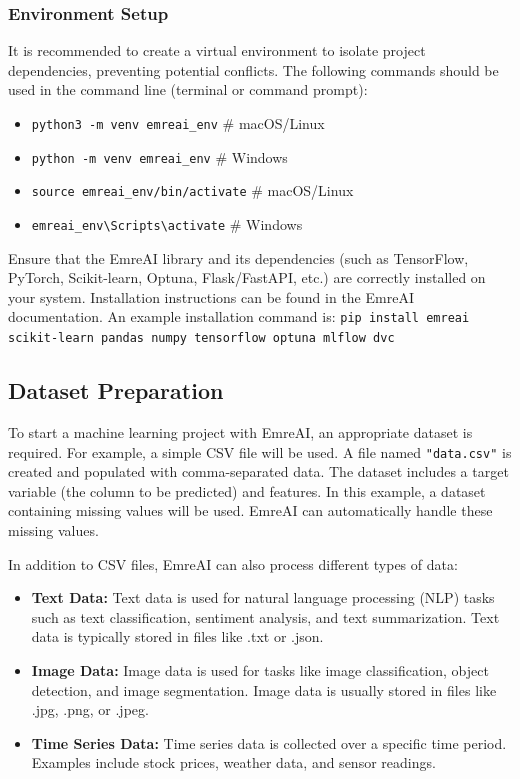\documentclass[conference]{IEEEtran}
\begin{document}
\subsubsection{Environment Setup}

It is recommended to create a virtual environment to isolate project dependencies, preventing potential conflicts.  
The following commands should be used in the command line (terminal or command prompt):
\begin{itemize}
    \item \texttt{python3 -m venv emreai\_env}  \# macOS/Linux
    \item \texttt{python -m venv emreai\_env}    \# Windows
    \item \texttt{source emreai\_env/bin/activate}  \# macOS/Linux
    \item \texttt{emreai\_env\textbackslash Scripts\textbackslash activate}  \# Windows
\end{itemize}

Ensure that the EmreAI library and its dependencies (such as TensorFlow, PyTorch, Scikit-learn, Optuna, Flask/FastAPI, etc.) are correctly installed on your system.  
Installation instructions can be found in the EmreAI documentation. An example installation command is:
\texttt{pip install emreai scikit-learn pandas numpy tensorflow optuna mlflow dvc}

\subsection{Dataset Preparation}

To start a machine learning project with EmreAI, an appropriate dataset is required.  
For example, a simple CSV file will be used. A file named \texttt{"data.csv"} is created and populated with comma-separated data.  
The dataset includes a target variable (the column to be predicted) and features. In this example, a dataset containing missing values will be used.  
EmreAI can automatically handle these missing values.

In addition to CSV files, EmreAI can also process different types of data:
\begin{itemize}
    \item \textbf{Text Data:} Text data is used for natural language processing (NLP) tasks such as text classification, sentiment analysis, and text summarization. Text data is typically stored in files like .txt or .json.
    \item \textbf{Image Data:} Image data is used for tasks like image classification, object detection, and image segmentation. Image data is usually stored in files like .jpg, .png, or .jpeg.
    \item \textbf{Time Series Data:} Time series data is collected over a specific time period. Examples include stock prices, weather data, and sensor readings.
\end{itemize}
\end{document}
